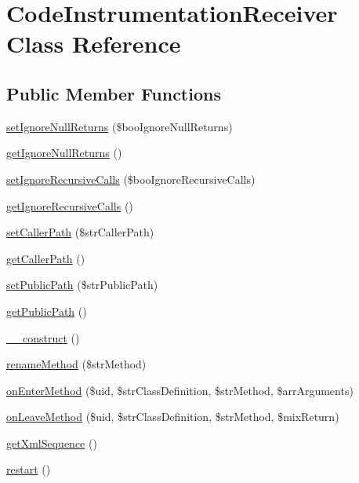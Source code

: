 \hypertarget{class_code_instrumentation_receiver}{
\section{CodeInstrumentationReceiver Class Reference}
\label{class_code_instrumentation_receiver}
}
\subsection*{Public Member Functions}
\begin{CompactItemize}
\item 
\hyperlink{class_code_instrumentation_receiver_57b10b692e4fa48f22b1586376108f1b}{setIgnoreNullReturns} (\$booIgnoreNullReturns)
\item 
\hyperlink{class_code_instrumentation_receiver_c9ab1942c4647d400e7af7145f29faf7}{getIgnoreNullReturns} ()
\item 
\hyperlink{class_code_instrumentation_receiver_9d58160ec1e8b7bb322fb4ee60f47998}{setIgnoreRecursiveCalls} (\$booIgnoreRecursiveCalls)
\item 
\hyperlink{class_code_instrumentation_receiver_9827f39df527b013a3d967215cac31d1}{getIgnoreRecursiveCalls} ()
\item 
\hyperlink{class_code_instrumentation_receiver_bdded6991e674ce82f04f701972ebf9f}{setCallerPath} (\$strCallerPath)
\item 
\hyperlink{class_code_instrumentation_receiver_a8c839c9d33ebad153541a31ffc7ef3e}{getCallerPath} ()
\item 
\hyperlink{class_code_instrumentation_receiver_261f2bb173e655f2ead64eda4c29e76a}{setPublicPath} (\$strPublicPath)
\item 
\hyperlink{class_code_instrumentation_receiver_74df99a19bc54d630a15e1778144eb31}{getPublicPath} ()
\item 
\hyperlink{class_code_instrumentation_receiver_095c5d389db211932136b53f25f39685}{\_\-\_\-construct} ()
\item 
\hyperlink{class_code_instrumentation_receiver_20bedeec5c454d58b3b5a3b579225323}{renameMethod} (\$strMethod)
\item 
\hyperlink{class_code_instrumentation_receiver_9e9c5a8aaabb5839bd53f2a4bf8738e1}{onEnterMethod} (\$uid, \$strClassDefinition, \$strMethod, \$arrArguments)
\item 
\hyperlink{class_code_instrumentation_receiver_857c9dfbe06ad7cd878585408b1c3d98}{onLeaveMethod} (\$uid, \$strClassDefinition, \$strMethod, \$mixReturn)
\item 
\hyperlink{class_code_instrumentation_receiver_feb0ab0d5955fcae20ff5062fa59fd79}{getXmlSequence} ()
\item 
\hyperlink{class_code_instrumentation_receiver_c8de9e38ce27c87f710dff42a13455cf}{restart} ()
\end{CompactItemize}
